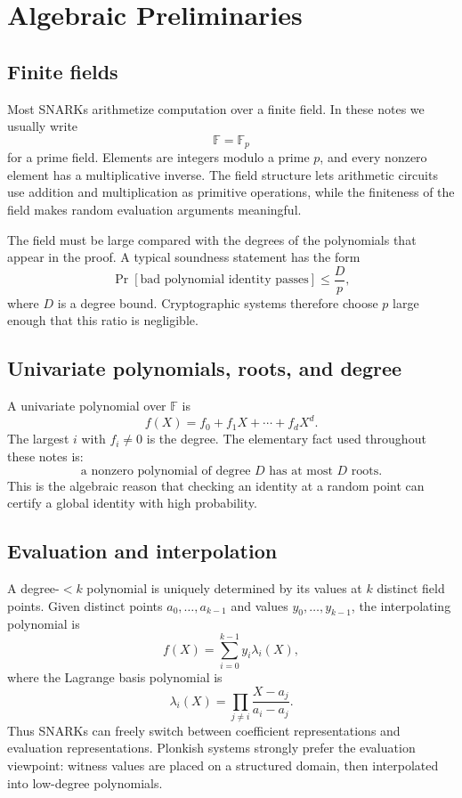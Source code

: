 \documentclass[11pt]{article}
\newcommand{\F}{\mathbb{F}}
\begin{document}
\section{Algebraic Preliminaries}
\label{sec:algebra-preliminaries}

\subsection{Finite fields}

Most SNARKs arithmetize computation over a finite field. In these notes we usually write
\[
    \F=\F_p
\]
for a prime field. Elements are integers modulo a prime $p$, and every nonzero element has a multiplicative inverse. The field structure lets arithmetic circuits use addition and multiplication as primitive operations, while the finiteness of the field makes random evaluation arguments meaningful.

The field must be large compared with the degrees of the polynomials that appear in the proof. A typical soundness statement has the form
\[
    \Pr[\text{bad polynomial identity passes}]\le \frac{D}{p},
\]
where $D$ is a degree bound. Cryptographic systems therefore choose $p$ large enough that this ratio is negligible.

\subsection{Univariate polynomials, roots, and degree}

A univariate polynomial over $\F$ is
\[
    f(X)=f_0+f_1X+\cdots+f_dX^d.
\]
The largest $i$ with $f_i\neq 0$ is the degree. The elementary fact used throughout these notes is:
\[
    \text{a nonzero polynomial of degree }D\text{ has at most }D\text{ roots.}
\]
This is the algebraic reason that checking an identity at a random point can certify a global identity with high probability.

\subsection{Evaluation and interpolation}

A degree-$<k$ polynomial is uniquely determined by its values at $k$ distinct field points. Given distinct points $a_0,\ldots,a_{k-1}$ and values $y_0,\ldots,y_{k-1}$, the interpolating polynomial is
\[
    f(X)=\sum_{i=0}^{k-1} y_i\lambda_i(X),
\]
where the Lagrange basis polynomial is
\[
    \lambda_i(X)=\prod_{j\neq i}\frac{X-a_j}{a_i-a_j}.
\]
Thus SNARKs can freely switch between coefficient representations and evaluation representations. Plonkish systems strongly prefer the evaluation viewpoint: witness values are placed on a structured domain, then interpolated into low-degree polynomials.
\end{document}
